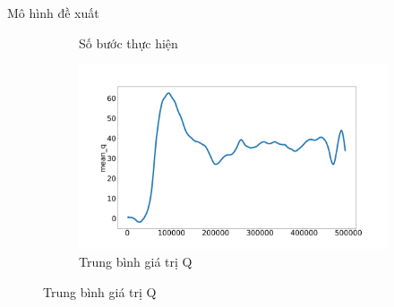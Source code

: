 \documentclass{beamer}
\begin{document}
\begin{frame}{Mô hình đề xuất}
\begin{figure}[ht]
\begin{subfigure}{.5\textwidth}
    		\caption{Số bước thực hiện}
    		\label{fig:baseline_step}
    	\end{subfigure}%
    	\begin{subfigure}{.5\textwidth}
    		\includegraphics[width=.9\textwidth]{Pic/baseline/mean_q.png}  
    		\caption{Trung bình giá trị Q}
    		\label{fig:baseline_mean_q}
    	\end{subfigure}
    	\label{fig:result_baseline}
    \end{figure}
\end{frame}
\end{document}
